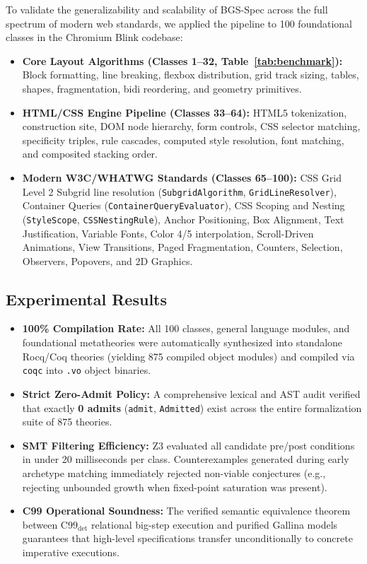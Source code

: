 \documentclass[10pt,journal,compsoc]{IEEEtran}
\begin{document}
To validate the generalizability and scalability of BGS-Spec across the full spectrum of modern web standards, we applied the pipeline to 100 foundational classes in the Chromium Blink codebase:
\begin{itemize}\setlength{\itemsep}{1pt}\setlength{\parskip}{0pt}
    \item \textbf{Core Layout Algorithms (Classes 1--32, Table~\ref{tab:benchmark}):} Block formatting, line breaking, flexbox distribution, grid track sizing, tables, shapes, fragmentation, bidi reordering, and geometry primitives.
    \item \textbf{HTML/CSS Engine Pipeline (Classes 33--64):} HTML5 tokenization, construction site, DOM node hierarchy, form controls, CSS selector matching, specificity triples, rule cascades, computed style resolution, font matching, and composited stacking order.
    \item \textbf{Modern W3C/WHATWG Standards (Classes 65--100):} CSS Grid Level 2 Subgrid line resolution (\texttt{SubgridAlgorithm}, \texttt{GridLineResolver}), Container Queries (\texttt{ContainerQueryEvaluator}), CSS Scoping and Nesting (\texttt{StyleScope}, \texttt{CSSNestingRule}), Anchor Positioning, Box Alignment, Text Justification, Variable Fonts, Color 4/5 interpolation, Scroll-Driven Animations, View Transitions, Paged Fragmentation, Counters, Selection, Observers, Popovers, and 2D Graphics.
\end{itemize}

\subsection{Experimental Results}
\begin{itemize}\setlength{\itemsep}{1pt}\setlength{\parskip}{0pt}
    \item \textbf{100\% Compilation Rate:} All 100 classes, general language modules, and foundational metatheories were automatically synthesized into standalone Rocq/Coq theories (yielding 875 compiled object modules) and compiled via \texttt{coqc} into \texttt{.vo} object binaries.
    \item \textbf{Strict Zero-Admit Policy:} A comprehensive lexical and AST audit verified that exactly \textbf{0 admits} (\texttt{admit}, \texttt{Admitted}) exist across the entire formalization suite of 875 theories.
    \item \textbf{SMT Filtering Efficiency:} Z3 evaluated all candidate pre/post conditions in under 20 milliseconds per class. Counterexamples generated during early archetype matching immediately rejected non-viable conjectures (e.g., rejecting unbounded growth when fixed-point saturation was present).
    \item \textbf{C99 Operational Soundness:} The verified semantic equivalence theorem between $\text{C99}_{\text{det}}$ relational big-step execution and purified Gallina models guarantees that high-level specifications transfer unconditionally to concrete imperative executions.
\end{itemize}
\end{document}
